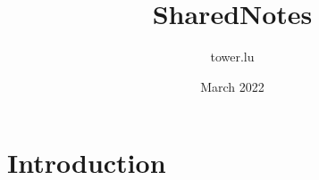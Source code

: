 \documentclass{article}
\title{SharedNotes}
\author{tower.lu }
\date{March 2022}
\begin{document}
\maketitle

\section{Introduction}
\end{document}

